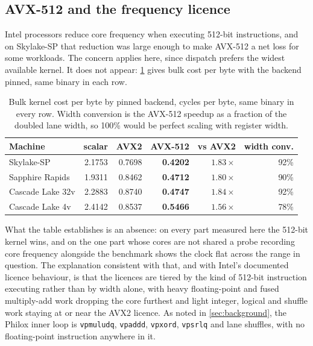 \documentclass[acmsmall,screen,review]{acmart}
\theoremstyle{acmdefinition}
\newcommand{\code}[1]{\texttt{#1}}
\begin{document}
\subsection{AVX-512 and the frequency licence}\label{sec:avx512}

Intel processors reduce core frequency when executing 512-bit instructions, and
on Skylake-SP that reduction was large enough to make AVX-512 a net loss for
some workloads. The concern applies here, since dispatch prefers the widest
available kernel. It does not appear: \cref{tab:avx512} gives bulk cost per byte
with the backend pinned, same binary in each row.

\begin{table}[t]
\centering
\caption{Bulk kernel cost per byte by pinned backend, cycles per byte, same
binary in every row. Width conversion is the AVX-512 speedup as a fraction of
the doubled lane width, so 100\% would be perfect scaling with
register width.}\label{tab:avx512}
\begin{tabular}{lrrrrr}
\toprule
Machine & scalar & AVX2 & AVX-512 & vs AVX2 & width conv. \\
\midrule
Skylake-SP        & 2.1753 & 0.7698 & \textbf{0.4202} & $1.83\times$ & 92\% \\
Sapphire Rapids   & 1.9311 & 0.8462 & \textbf{0.4712} & $1.80\times$ & 90\% \\
Cascade Lake 32v  & 2.2883 & 0.8740 & \textbf{0.4747} & $1.84\times$ & 92\% \\
Cascade Lake 4v   & 2.4142 & 0.8537 & \textbf{0.5466} & $1.56\times$ & 78\% \\
\bottomrule
\end{tabular}
\end{table}

What the table establishes is an absence: on every part measured here the
512-bit kernel wins, and on the one part whose cores are not shared a probe
recording core frequency alongside the benchmark shows the clock flat across the
range in question. The explanation consistent with that, and with Intel's
documented licence behaviour, is that the licences are tiered by the kind of
512-bit instruction executing rather than by width alone, with heavy
floating-point and fused multiply-add work dropping the core furthest and light
integer, logical and shuffle work staying at or near the AVX2 licence. As noted
in \cref{sec:background}, the Philox inner loop is \code{vpmuludq},
\code{vpaddd}, \code{vpxord}, \code{vpsrlq} and lane shuffles, with no
floating-point instruction anywhere in it.
\end{document}
